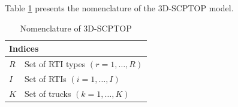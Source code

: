 Table \ref{tab:Nomenclature} presents the nomenclature of the 3D-SCPTOP model.
\FloatBarrier
\begin{longtable}[hbt!]{  |p{}|p{}  |}
  \caption{Nomenclature of 3D-SCPTOP}
  \label{tab:Nomenclature}
  \\
  \hline
  \multicolumn{2}{|l|}{\textbf{Indices}}                                                                                                                                                                                                                                                                                                                                                                                                                                                                                                                                                                                                                                          \\ \hline
  $R$                                                                                            & Set of RTI types $(r = 1, \dots, R)$                                                                                                                                                                                                                                                                                                                                                                                                                                                                                                                                           \\
  $I$                                                                                            & Set of RTIs $(i = 1, \dots , I)$                                                                                                                                                                                                                                                                                                                                                                                                                                                                                                                                               \\
  $K$                                                                                            & Set of trucks $(k =1,\dots , K)$
  \\

\end{longtable}

